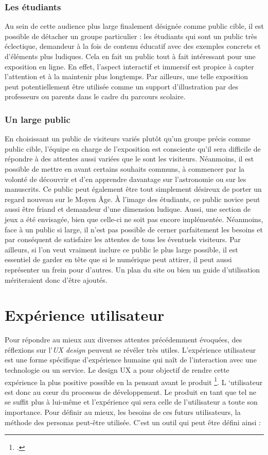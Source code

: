     \subsubsection{Les étudiants}
    Au sein de cette audience plus large finalement désignée comme public cible, il est possible de détacher un groupe particulier : les étudiants qui sont un public très éclectique, demandeur à la fois de contenu éducatif avec des exemples concrets et d’éléments plus ludiques. Cela en fait un public tout à fait intéressant pour une exposition en ligne. En effet, l’aspect interactif et immersif est propice à capter l’attention et à la maintenir plus longtemps. Par ailleurs, une telle exposition peut potentiellement être utilisée comme un support d’illustration par des professeurs ou parents dans le cadre du parcours scolaire. 

    \subsubsection{Un large public}
    En choisissant un public de visiteurs variés plutôt qu’un groupe précis comme public cible, l’équipe en charge de l’exposition est consciente qu’il sera difficile de répondre à des attentes aussi variées que le sont les visiteurs. Néanmoins, il est possible de mettre en avant certains souhaits communs, à commencer par la volonté de découvrir et d’en apprendre davantage sur l’astronomie ou sur les manuscrits. Ce public peut également être tout simplement désireux de porter un regard nouveau sur le Moyen Âge.  À l’image des étudiants, ce public novice peut aussi être friand et demandeur d’une dimension ludique. Aussi, une section de jeux a été envisagée, bien que celle-ci ne soit pas encore implémentée. 
    Néanmoins, face à un public si large, il n’est pas possible de cerner parfaitement les besoins et par conséquent de satisfaire les attentes de tous les éventuels visiteurs. Par ailleurs, si l’on veut vraiment inclure ce public le plus large possible, il est essentiel de garder en tête que si le numérique peut attirer, il peut aussi représenter un frein pour d’autres. Un plan du site ou bien un guide d’utilisation mériteraient donc d’être ajoutés. 

	\section{Expérience utilisateur}
	Pour répondre au mieux aux diverses attentes précédemment évoquées, des réflexions sur l’\textit{UX design} peuvent se révéler très utiles. 				\og{} L’expérience utilisateur est une forme spécifique d’expérience humaine qui naît de l’interaction avec une technologie ou un service. Le design UX a pour objectif de rendre cette expérience la plus positive possible en la pensant avant le produit\fg{} \footnote{\cite{gronierMethodesDesignUX2017a}.}. L ‘utilisateur est donc au cœur du processus de développement. Le produit en tant que tel ne se suffit plus à lui-même et l’expérience qui sera celle de l’utilisateur a toute son importance. Pour définir au mieux, les besoins de ces futurs utilisateurs, la méthode des personas peut-être utilisée. C’est un outil qui peut être défini ainsi : 

